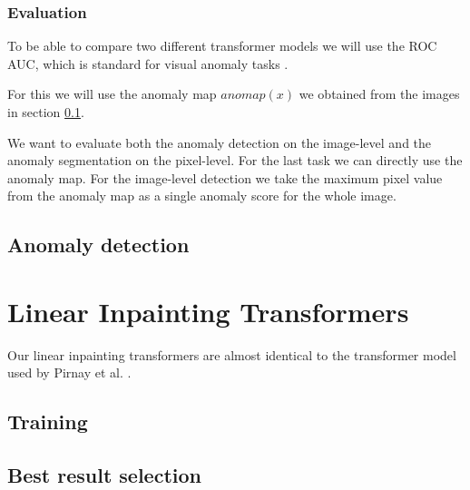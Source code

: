 \subsubsection{Evaluation}

To be able to compare two different transformer models we will use the ROC AUC, which is standard for visual anomaly tasks \cite{pirnay_inpainting_2021, zavrtanik_reconstruction_2021, schlegl_unsupervised_2017, li_cutpaste_2021, tsai_autoencoder-based_2021, xie_semisupervised_2021, bergmann_mvtec_2019}.

For this we will use the anomaly map $anomap(x)$ we obtained from the images in section \ref{sec:methods-setup-ad}.

We want to evaluate both the anomaly detection on the image-level and the anomaly segmentation on the pixel-level. For the last task we can directly use the anomaly map. For the image-level detection we take the maximum pixel value from the anomaly map as a single anomaly score for the whole image.

\subsection{Anomaly detection}\label{sec:methods-setup-ad}



\section{Linear Inpainting Transformers}

Our linear inpainting transformers are almost identical to the transformer model used by Pirnay et al. \cite{pirnay_inpainting_2021}.



\subsection{Training}


\subsection{Best result selection}


\subsection{}